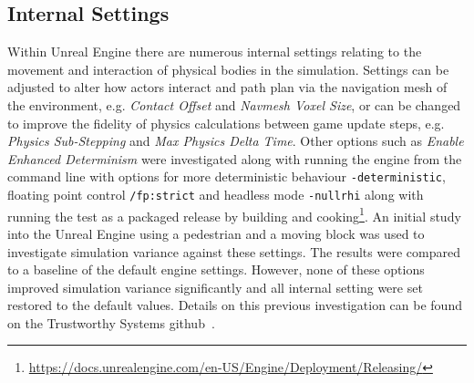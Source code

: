 \documentclass[letterpaper, 10 pt, journal, twoside]{IEEEtran}
\begin{document}
\subsection{Internal Settings}

Within Unreal Engine there are numerous internal settings relating to the movement and interaction of physical bodies in the simulation. Settings can be adjusted to alter how actors interact and path plan via the navigation mesh of the environment, e.g. \textit{Contact Offset} and \textit{Navmesh Voxel Size}, or can be changed to improve the fidelity of physics calculations between game update steps, e.g. \textit{Physics Sub-Stepping} and \textit{Max Physics Delta Time}. Other options such as \textit{Enable Enhanced Determinism} were investigated along with running the engine from the command line with options for more deterministic behaviour \texttt{-deterministic}, floating point control \texttt{/fp:strict} and headless mode \texttt{-nullrhi} along with running the test as a packaged release by building and cooking\footnote{\url{https://docs.unrealengine.com/en-US/Engine/Deployment/Releasing/}}. 
An initial study into the Unreal Engine using a pedestrian and a moving block was used to investigate simulation variance against these settings. The results were compared to a baseline of the default engine settings. 
%
However, none of these options improved simulation variance significantly and all internal setting were set restored to the default values. Details on this previous investigation can be found on the Trustworthy Systems github~\cite{TSLUnrealEngineTesting}.
\end{document}
